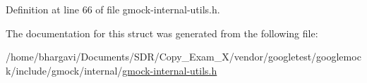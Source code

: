 Definition at line 66 of file gmock-\/internal-\/utils.\+h.



The documentation for this struct was generated from the following file\+:\begin{DoxyCompactItemize}
\item 
/home/bhargavi/\+Documents/\+S\+D\+R/\+Copy\+\_\+\+Exam\+\_\+X/vendor/googletest/googlemock/include/gmock/internal/\hyperlink{gmock-internal-utils_8h}{gmock-\/internal-\/utils.\+h}\end{DoxyCompactItemize}
